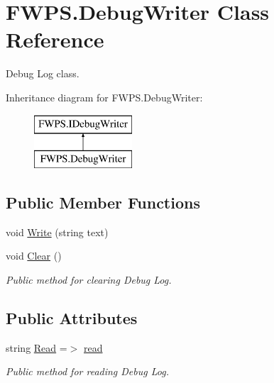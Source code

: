 \hypertarget{class_f_w_p_s_1_1_debug_writer}{}\section{F\+W\+P\+S.\+Debug\+Writer Class Reference}
\label{class_f_w_p_s_1_1_debug_writer}


Debug Log class.  


Inheritance diagram for F\+W\+P\+S.\+Debug\+Writer\+:\begin{figure}[H]
\begin{center}
\leavevmode
\includegraphics[height=2.000000cm]{class_f_w_p_s_1_1_debug_writer}
\end{center}
\end{figure}
\subsection*{Public Member Functions}
\begin{DoxyCompactItemize}
\item 
void \mbox{\hyperlink{class_f_w_p_s_1_1_debug_writer_a5bcf9f0db8527f6440d749910e276998}{Write}} (string text)
\item 
void \mbox{\hyperlink{class_f_w_p_s_1_1_debug_writer_ab34d96db0bb866e444604b733171519c}{Clear}} ()
\begin{DoxyCompactList}\small\item\em Public method for clearing Debug Log. \end{DoxyCompactList}\end{DoxyCompactItemize}
\subsection*{Public Attributes}
\begin{DoxyCompactItemize}
\item 
string \mbox{\hyperlink{class_f_w_p_s_1_1_debug_writer_a9d0c7fb6aaf43aaadda1a0a2b3780e57}{Read}} =$>$ \mbox{\hyperlink{class_f_w_p_s_1_1_debug_writer_a75b93784e256da1f4af6fa8ca66227d0}{read}}
\begin{DoxyCompactList}\small\item\em Public method for reading Debug Log. \end{DoxyCompactList}\end{DoxyCompactItemize}
